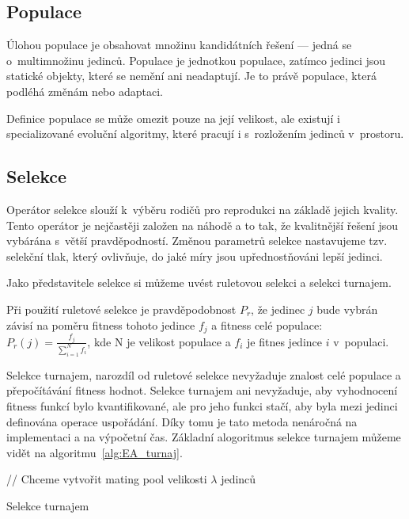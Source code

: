 \subsection{Populace}
Úlohou populace je obsahovat množinu kandidátních řešení --- jedná se o~multimnožinu jedinců.
Populace je jednotkou populace, zatímco jedinci jsou statické objekty, které se nemění ani neadaptují.
Je to právě populace, která podléhá změnám nebo adaptaci.

Definice populace se může omezit pouze na její velikost, ale existují i specializované evoluční algoritmy, které pracují i s~rozložením jedinců v~prostoru.


\subsection{Selekce}
Operátor selekce slouží k~výběru rodičů pro reprodukci na základě jejich kvality.
Tento operátor je nejčastěji založen na náhodě a to tak, že kvalitnější řešení jsou vybárána s~větší pravděpodností.
Změnou parametrů selekce nastavujeme tzv. selekční tlak, který ovlivňuje, do jaké míry jsou upřednostňováni lepší jedinci.

Jako představitele selekce si můžeme uvést ruletovou selekci a selekci turnajem.

Při použití ruletové selekce je pravděpodobnost $P_r$, že jedinec $j$ bude vybrán závisí na poměru fitness tohoto jedince $f_j$ a fitness celé populace:
$P_r(j) = \frac{f_j}{\sum_{i=1}^{N}f_i}$, kde N je velikost populace a $f_i$ je fitnes jedince $i$ v~populaci.

Selekce turnajem, narozdíl od ruletové selekce nevyžaduje znalost celé populace a přepočítávání fitness hodnot.
Selekce turnajem ani nevyžaduje, aby vyhodnocení fitness funkcí bylo kvantifikované, ale pro jeho funkci stačí, aby byla mezi jedinci definována operace uspořádání.
Díky tomu je tato metoda nenáročná na implementaci a na výpočetní čas.
Základní alogoritmus selekce turnajem můžeme vidět na algoritmu~\ref{alg:EA_turnaj}.

\begin{algorithm}[H]
    // Chceme vytvořit mating pool velikosti $\lambda$ jedinců\;
    \caption{Selekce turnajem}
    \label{alg:EA_turnaj}
\end{algorithm}

